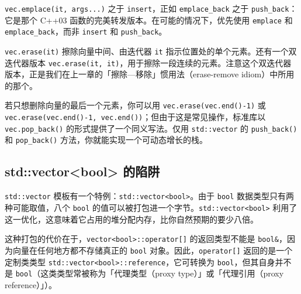 \texttt{vec.\allowbreak{}emplace(\allowbreak{}it,\allowbreak{} args...)\allowbreak{}} 之于 \texttt{insert}，正如 \texttt{emplace\_\allowbreak{}back} 之于 \texttt{push\_\allowbreak{}back}：它是那个 C++03 函数的完美转发版本。在可能的情况下，优先使用 \texttt{emplace} 和 \texttt{emplace\_\allowbreak{}back}，而非 \texttt{insert} 和 \texttt{push\_\allowbreak{}back}。

\texttt{vec.\allowbreak{}erase(\allowbreak{}it)\allowbreak{}} 擦除向量中间、由迭代器 \texttt{it} 指示位置处的单个元素。还有一个双迭代器版本 \texttt{vec.\allowbreak{}erase(\allowbreak{}it,\allowbreak{} it)\allowbreak{}}，用于擦除一段连续的元素。注意这个双迭代器版本，正是我们在上一章的「擦除—移除」惯用法（erase-remove idiom）中所用的那个。

若只想删除向量的最后一个元素，你可以用 \texttt{vec.\allowbreak{}erase(\allowbreak{}vec.\allowbreak{}end(\allowbreak{})\allowbreak{}-1)\allowbreak{}} 或 \texttt{vec.\allowbreak{}erase(\allowbreak{}vec.\allowbreak{}end(\allowbreak{})\allowbreak{}-1,\allowbreak{} vec.\allowbreak{}end(\allowbreak{})\allowbreak{})\allowbreak{}}；但由于这是常见操作，标准库以 \texttt{vec.\allowbreak{}pop\_\allowbreak{}back(\allowbreak{})\allowbreak{}} 的形式提供了一个同义写法。仅用 \texttt{std::\allowbreak{}vector} 的 \texttt{push\_\allowbreak{}back(\allowbreak{})\allowbreak{}} 和 \texttt{pop\_\allowbreak{}back(\allowbreak{})\allowbreak{}} 方法，你就能实现一个可动态增长的栈。

\subsection{std::vector<bool> 的陷阱}

\texttt{std::\allowbreak{}vector} 模板有一个特例：\texttt{std::\allowbreak{}vector<\allowbreak{}bool>\allowbreak{}}。由于 \texttt{bool} 数据类型只有两种可能取值，八个 \texttt{bool} 的值可以被打包进一个字节。\texttt{std::\allowbreak{}vector<\allowbreak{}bool>\allowbreak{}} 利用了这一优化，这意味着它占用的堆分配内存，比你自然预期的要少八倍。


这种打包的代价在于，\texttt{vector<\allowbreak{}bool>\allowbreak{}::\allowbreak{}operator[]} 的返回类型不能是 \texttt{bool\&}，因为向量在任何地方都不存储真正的 \texttt{bool} 对象。因此，\texttt{operator[]} 返回的是一个定制类类型 \texttt{std::\allowbreak{}vector<\allowbreak{}bool>\allowbreak{}::\allowbreak{}reference}，它可转换为 \texttt{bool}，但其自身并不是 \texttt{bool}（这类类型常被称为「代理类型（proxy type）」或「代理引用（proxy reference）」）。

